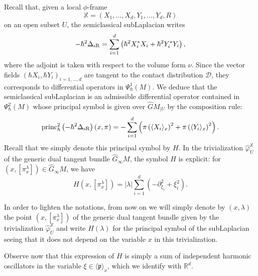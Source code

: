 \documentclass[12pt,a4paper]{amsart}
\theoremstyle{plain}
\theoremstyle{definition}
\theoremstyle{remark}
\numberwithin{equation}{section}
\theoremstyle{definition}
\def\R{{\mathbb R}}%
\def \cD{\mathcal{D}}
\def \bX{\mathbb{X}}
\def \Ghat{\widehat{G}}
\def \princ{{\rm princ}_{\hbar}}
\numberwithin{equation}{section}
\begin{document}
Recall that, given a local $\phi$-frame 
$$\bX = (X_1,\dots,X_d,Y_1,\dots,Y_d,R)$$ 
on an open subset $U$, the semiclassical subLaplacian writes 
\begin{equation*}
    -\hbar^2\Delta_{\rm sR} = \sum_{i=1}^d \left(\hbar^2 X_{i}^* X_i + \hbar^2 Y_{i}^*Y_i\right),
\end{equation*}
where the adjoint is taken with respect to the volume form $\nu$. Since the vector fields $(\hbar X_i,\hbar Y_i)_{i=1,\dots,d}$ are tangent to the contact distribution $\cD$, they corresponds to differential operators in $\Psi_\hbar^1(M)$. We deduce that the semiclassical subLaplacian is an admissible differential operator contained in $\Psi_\hbar^2(M)$ whose principal symbol is given over $\Ghat M_{|U}$ by the composition rule: 
\begin{equation*}
    \princ^2\left(-\hbar^2 \Delta_{\rm sR}\right)(x,\pi) = -\sum_{i=1}^d \left(\pi\left(\langle X_i\rangle_x\right)^2+ \pi\left(\langle Y_i\rangle_x\right)^2\right).
\end{equation*}
Recall that we simply denote this principal symbol by $H$. In the trivialization $\hat{\varphi}_U^\bX$ of the generic dual tangent bundle $\Ghat_\infty M$, the symbol $H$ is explicit: for $(x,[\pi_x^\lambda])\in \Ghat_\infty M$, we have
\begin{equation}
    \label{eq:symH}
    H(x,[\pi_x^\lambda]) = |\lambda| \sum_{i=1}^d \left(-\partial_{\xi_i}^2 + \xi_i^2\right).
\end{equation}

In order to lighten the notations, from now on we will simply denote by $(x,\lambda)$ the point $(x,[\pi_x^\lambda])$ of the generic dual tangent bundle given by the trivialization $\hat{\varphi}_U^\bX$ and write $H(\lambda)$ for the principal symbol of the subLaplacian seeing that it does not depend on the variable $x$ in this trivialization.

Observe now that this expression of $H$ is simply a sum of independent harmonic oscillators in the variable $\xi \in \langle \mathfrak{p}\rangle_x$, which we identify with $\R^d$. 

\bigskip
\end{document}
